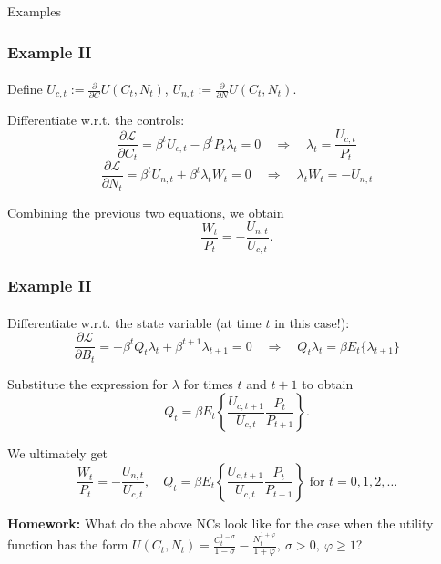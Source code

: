 \documentclass[10pt]{beamer}
\theoremstyle{definition}
\begin{document}
\begin{section}{Examples}
\begin{frame}
\frametitle{Example II}
\framesubtitle{}
Define $ U_{c,t} := \frac{\partial}{\partial C}U(C_t,N_t)$, $ U_{n,t} := \frac{\partial}{\partial N}U(C_t,N_t)$.\bigskip

Differentiate w.r.t. the controls:
\[ \frac{\partial \mathcal{L} }{\partial C_t} = \beta^t U_{c,t} - \beta^t P_t \lambda_t = 0 \quad\Longrightarrow\quad \lambda_t = \frac{U_{c,t}}{P_t} \]
\[  \frac{\partial \mathcal{L} }{\partial N_t} = \beta^t U_{n,t}+\beta^t \lambda_t W_t =0 \quad\Longrightarrow\quad \lambda_t W_t = -U_{n,t}  \]\bigskip

Combining the previous two equations, we obtain \[ \frac{W_t}{P_t} = -\frac{U_{n,t}}{U_{c,t}}. \]
\end{frame}




\begin{frame}
\frametitle{Example II}
\framesubtitle{}
Differentiate w.r.t. the state variable (at time $ t $ in this case!):
\[ \frac{\partial \mathcal{L} }{\partial B_t} = -\beta^t Q_t \lambda_t + \beta^{t+1}\lambda_{t+1} = 0 \quad\Longrightarrow\quad Q_t \lambda_t = \beta E_t \{\lambda_{t+1}\} \]

Substitute the expression for $ \lambda $ for times $ t $ and $ t+1 $ to obtain 
\[ Q_t = \beta E_t \left\{ \frac{U_{c,t+1}}{U_{c,t}}\frac{P_t}{P_{t+1}} \right\} .  \]

We ultimately get \[ \frac{W_t}{P_t} = -\frac{U_{n,t}}{U_{c,t}}, \quad Q_t = \beta E_t \left\{ \frac{U_{c,t+1}}{U_{c,t}}\frac{P_t}{P_{t+1}} \right\} \text{ for } t=0,1,2,\ldots \]

\textbf{Homework:} What do the above NCs look like for the case when the utility function has the form $ U(C_t,N_t)=\frac{C_t^{1-\sigma}}{1-\sigma}-\frac{N_t^{1+\varphi}}{1+\varphi},~\sigma>0,~\varphi \geq 1 $?
\end{frame}

\end{section}
\end{document}
